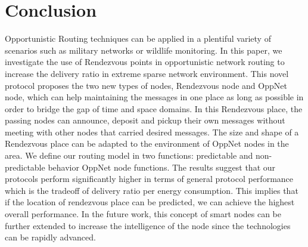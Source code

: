 \section{Conclusion}
\label{DRRA:Conclusion}

Opportunistic Routing techniques can be applied in a plentiful variety of scenarios such as military networks or wildlife monitoring. 
%
In this paper, we investigate the use of Rendezvous points in opportunistic network routing to increase the delivery ratio in extreme sparse network environment.
%
This novel protocol proposes the two new types of nodes, Rendezvous node and OppNet node, which can help maintaining the messages in one place as long as possible in order to bridge the gap of time and space domains.
%
In this Rendezvous place, the passing nodes can announce, deposit and pickup their own messages without meeting with other nodes that carried desired messages.
%
The size and shape of a Rendezvous place can be adapted to the environment of OppNet nodes in the area.
%
We define our routing model in two functions: predictable  and non-predictable behavior OppNet node functions.
%
The results suggest that our protocols perform significantly higher in terms of general protocol performance which is the tradeoff of delivery ratio per energy consumption.
%
This implies that if the location of rendezvous place can be predicted, we can achieve the highest overall performance.
In the future work, this concept of smart nodes can be further extended to increase the intelligence of the node since the technologies can be rapidly advanced.


